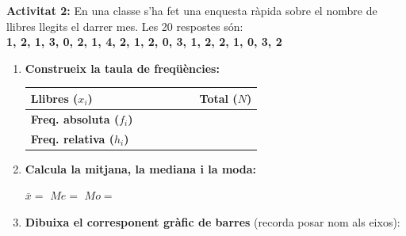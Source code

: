 \documentclass[12pt,a4paper]{article}
\begin{document}
\vspace{0.1cm}

\newpage
\noindent\textbf{Activitat 2:} En una classe s'ha fet una enquesta ràpida sobre el nombre de llibres llegits el darrer mes. Les 20 respostes són:\\
\textbf{1, 2, 1, 3, 0, 2, 1, 4, 2, 1, 2, 0, 3, 1, 2, 2, 1, 0, 3, 2}

\vspace{0.2cm}
\begin{enumerate}[label=\alph*)]
    \item \textbf{Construeix la taula de freqüències:}
    
    \vspace{0.1cm}
    \renewcommand{\arraystretch}{1.5}
    \begin{table}[h]
    \begin{tabular}{|l|c|c|c|c|c|c|}
        \hline
        \textbf{Llibres ($x_i$)} & \hspace{0.8cm} & \hspace{0.8cm} & \hspace{0.8cm} & \hspace{0.8cm} & \hspace{0.8cm} & \textbf{Total ($N$)} \\ \hline
        \textbf{Freq. absoluta ($f_i$)} & & & & & & \\ \hline
        \textbf{Freq. relativa ($h_i$)} & & & & & & \\ \hline
    \end{tabular}
    \end{table}
    
    \item \textbf{Calcula la mitjana, la mediana i la moda:}
    
    \vspace{0.6cm}
    $\bar{x} =$ \hspace{3cm} $Me =$ \hspace{3cm} $Mo =$
    \vspace{0.6cm}
    
    \item \textbf{Dibuixa el corresponent gràfic de barres} (recorda posar nom als eixos):
    \vspace{4.5cm} %
\end{enumerate}
\end{document}
